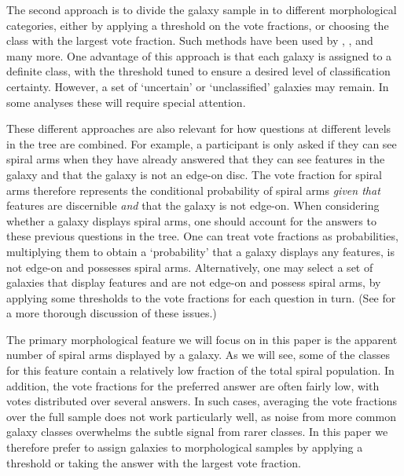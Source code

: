 \documentclass[useAMS,usenatbib]{mn2e}
\begin{document}
The second approach is to divide the galaxy sample in to different morphological categories, either by applying a threshold on the vote fractions, or choosing the class with the largest vote fraction. Such methods have been used by \citet{Land_08}, \citet{Skibba_09}, and many more.  One advantage of this approach is that each galaxy is assigned to a definite class, with the threshold tuned to ensure a desired level of classification certainty.  However, a set of `uncertain' or `unclassified' galaxies may remain.  In some analyses these will require special attention.

These different approaches are also relevant for how questions at different levels in the tree are combined.  For example, a participant is only asked if they can see spiral arms when they have already answered that they can see features in the galaxy and that the galaxy is not an edge-on disc.  The vote fraction for spiral arms therefore represents the conditional probability of spiral arms \emph{given that} features are discernible \emph{and} that the galaxy is not edge-on. When considering whether a galaxy displays spiral arms, one should account for the answers to these previous questions in the tree.  One can treat vote fractions as probabilities, multiplying them to obtain a `probability' that a galaxy displays any features, is not edge-on and possesses spiral arms.  Alternatively, one may select a set of galaxies that display features and are not edge-on and possess spiral arms, by applying some thresholds to the vote fractions for each question in turn. (See \citealt{Casteels_13} for a more thorough discussion of these issues.)

The primary morphological feature we will focus on in this paper is the apparent number of spiral arms displayed by a galaxy.  As we will see, some of the classes for this feature contain a relatively low fraction of the total spiral population.  In addition, the vote fractions for the preferred answer are often fairly low, with votes distributed over several answers.  In such cases, averaging the vote fractions over the full sample does not work particularly well, as noise from more common galaxy classes overwhelms the subtle signal from rarer classes.  In this paper we therefore prefer to assign galaxies to morphological samples by applying a threshold or taking the answer with the largest vote fraction.

\end{document}
